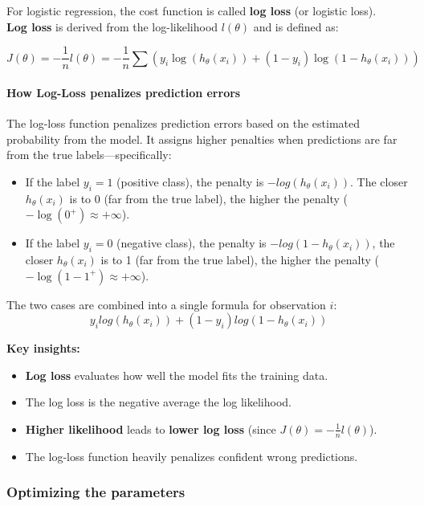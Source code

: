 \documentclass{article}
\providecommand{\tightlist}{%
  \setlength{\itemsep}{0pt}\setlength{\parskip}{0pt}}
\begin{document}
For logistic regression, the cost function is called \textbf{log loss}
(or logistic loss).\\
\textbf{Log loss} is derived from the log-likelihood \(l(\theta)\) and
is defined as:

\[J(\theta) = -\dfrac{1}{n}l(\theta) = -\frac{1}{n} \sum(y_i \log(h_\theta(x_i)) + (1 - y_i) \log(1 - h_\theta(x_i)))\]

\paragraph{How Log-Loss penalizes prediction
errors}\label{how-log-loss-penalizes-prediction-errors}

The log-loss function penalizes prediction errors based on the estimated
probability from the model. It assigns higher penalties when predictions
are far from the true labels---specifically:

\begin{itemize}
\item
  If the label \(y_i = 1\) (positive class), the penalty is
  \(-log(h_{\theta}(x_i))\). The closer \(h_{\theta}(x_i)\) is to 0 (far
  from the true label), the higher the penalty
  (\(-\log(0^+) \approx + \infty\)).
\item
  If the label \(y_i = 0\) (negative class), the penalty is
  \(-log(1-h_{\theta}(x_i))\), the closer \(h_{\theta}(x_i)\) is to 1
  (far from the true label), the higher the penalty
  (\(-\log(1 -1^+) \approx + \infty\)).
\end{itemize}

The two cases are combined into a single formula for observation \(i\):
\[y_i log(h_\theta(x_i)) + (1 - y_i) log(1 - h_\theta(x_i))\]

\textbf{Key insights:}

\begin{itemize}
\tightlist
\item
  \textbf{Log loss} evaluates how well the model fits the training data.
\item
  The log loss is the negative average the log likelihood.
\item
  \textbf{Higher likelihood} leads to \textbf{lower log loss} (since
  \(J(\theta) = -\frac{1}{n}l(\theta)\)).
\item
  The log-loss function heavily penalizes confident wrong predictions.
\end{itemize}

\subsubsection{Optimizing the
parameters}\label{optimizing-the-parameters}
\end{document}
